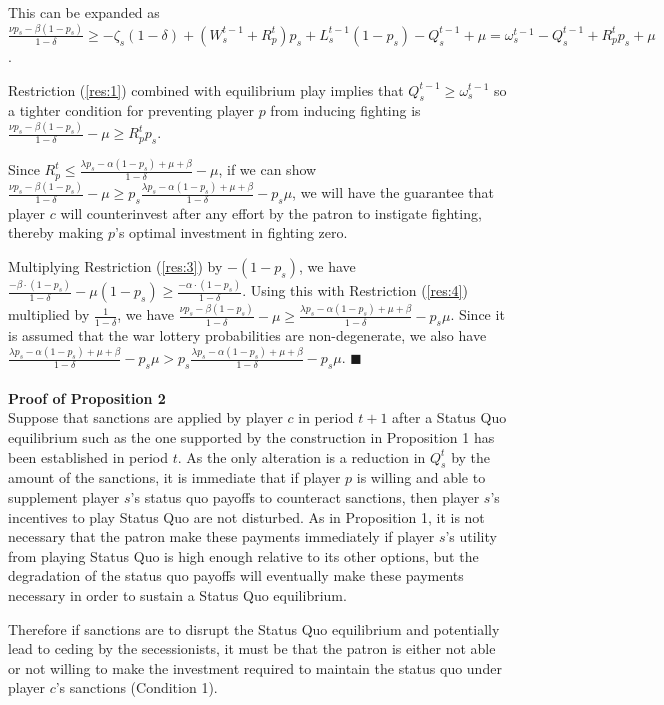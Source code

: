 \documentclass[11pt,letterpaper, notitlepage]{article}
\newcommand{\de}{\delta}
\begin{document}
This can be expanded as $\frac{\nu p_s - \beta (1-p_s)}{1 -\de}  \geq -\zeta_{s}(1-\de) + (W_s^{t-1}+R_p^t)p_s + L_s^{t-1}(1-p_s) - Q_s^{t-1} +\mu = \omega_s^{t-1} - Q_s^{t-1} +R_p^t p_s + \mu$. 

Restriction (\ref{res:1}) combined with equilibrium play implies that  $Q_s^{t-1} \geq \omega_s^{t-1}$ so a tighter condition for preventing player $p$ from inducing fighting is $\frac{\nu p_s - \beta (1-p_s)}{1 -\de} - \mu \geq R_p^t p_s$. 

Since $R_p^t \leq \frac{\lambda p_s - \alpha (1-p_s) + \mu + \beta}{1 - \de} -\mu$, if we can show $\frac{\nu p_s - \beta (1-p_s)}{1 -\de}  - \mu \geq p_s \frac{\lambda p_s - \alpha (1-p_s) + \mu + \beta}{1 - \de} - p_s \mu$, we will have the guarantee that player $c$ will counterinvest after any effort by the patron to instigate fighting, thereby making $p$'s optimal investment in fighting zero.

Multiplying Restriction (\ref{res:3}) by $-(1-p_s)$, we have $\frac{-\beta \cdot (1-p_s)}{1-\de} -\mu (1-p_s) \geq \frac{-\alpha \cdot (1-p_s)}{1-\de}$. Using this with Restriction (\ref{res:4}) multiplied by $\frac{1}{1-\de}$, we have $\frac{\nu p_s - \beta (1-p_s)}{1-\de} -\mu \geq \frac{\lambda p_s - \alpha (1-p_s) + \mu + \beta}{1-\de} -p_s \mu$. Since it is assumed that the war lottery probabilities are non-degenerate, we also have $\frac{\lambda p_s - \alpha (1-p_s) + \mu + \beta}{1-\de} -p_s \mu > p_s \frac{\lambda p_s - \alpha (1-p_s) + \mu + \beta}{1-\de} -p_s \mu$. \hfill $\blacksquare$
\\
\\
{\bf Proof of Proposition 2} \\
Suppose that sanctions are applied by player $c$ in period $t+1$ after a Status Quo equilibrium such as the one supported by the construction in Proposition 1 has been established in period $t$. As the only alteration is a reduction in $Q_s^t$ by the amount of the sanctions, it is immediate that if player $p$ is willing and able to supplement player $s$'s status quo payoffs to counteract sanctions, then player $s$'s incentives to play Status Quo are not disturbed. As in Proposition 1, it is not necessary that the patron make these payments immediately if player $s$'s utility from playing Status Quo is high enough relative to its other options, but the degradation of the status quo payoffs will eventually make these payments necessary in order to sustain a Status Quo equilibrium.

Therefore if sanctions are to disrupt the Status Quo equilibrium and potentially lead to ceding by the secessionists, it must be that the patron is either not able or not willing to make the investment required to maintain the status quo under player $c$'s sanctions (Condition 1).
\end{document}
